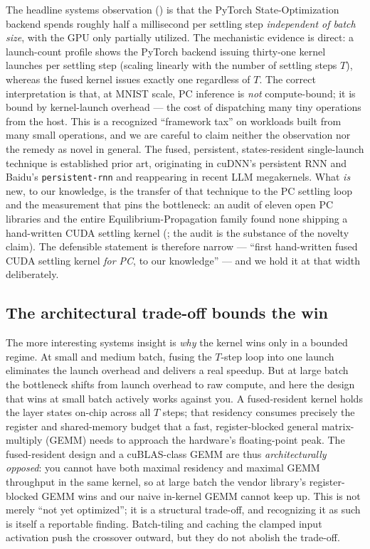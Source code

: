 The headline systems observation () is that the PyTorch State-Optimization
backend spends roughly half a millisecond per settling step \emph{independent of batch size}, with
the GPU only partially utilized. The mechanistic evidence is direct: a launch-count profile shows
the PyTorch backend issuing thirty-one kernel launches per settling step (scaling linearly with the
number of settling steps $T$), whereas the fused kernel issues exactly one regardless of $T$. The
correct interpretation is that, at MNIST scale, PC inference is \emph{not} compute-bound; it is
bound by kernel-launch overhead --- the cost of dispatching many tiny operations from the host. This
is a recognized ``framework tax'' on workloads built from many small operations, and we are careful
to claim neither the observation nor the remedy as novel in general. The fused, persistent,
states-resident single-launch technique is established prior art, originating in cuDNN's persistent
RNN and Baidu's \texttt{persistent-rnn} \citep{diamos2016persistent} and reappearing in recent LLM
megakernels. What \emph{is} new, to our knowledge, is the transfer of that technique to the PC
settling loop and the measurement that pins the bottleneck: an audit of eleven open PC libraries and
the entire Equilibrium-Propagation family found none shipping a hand-written CUDA settling kernel
(; the audit is the substance of the novelty claim). The defensible statement is
therefore narrow --- ``first hand-written fused CUDA settling kernel \emph{for PC}, to our
knowledge'' --- and we hold it at that width deliberately.

\subsection{The architectural trade-off bounds the win}

The more interesting systems insight is \emph{why} the kernel wins only in a bounded regime. At
small and medium batch, fusing the $T$-step loop into one launch eliminates the launch overhead and
delivers a real speedup. But at large batch the bottleneck shifts from launch overhead to raw
compute, and here the design that wins at small batch actively works against you. A fused-resident
kernel holds the layer states on-chip across all $T$ steps; that residency consumes precisely the
register and shared-memory budget that a fast, register-blocked general matrix-multiply (GEMM) needs
to approach the hardware's floating-point peak. The fused-resident design and a cuBLAS-class GEMM are
thus \emph{architecturally opposed}: you cannot have both maximal residency and maximal GEMM
throughput in the same kernel, so at large batch the vendor library's register-blocked GEMM wins and
our naive in-kernel GEMM cannot keep up. This is not merely ``not yet optimized''; it is a structural
trade-off, and recognizing it as such is itself a reportable finding. Batch-tiling and caching the
clamped input activation push the crossover outward, but they do not abolish the trade-off.


